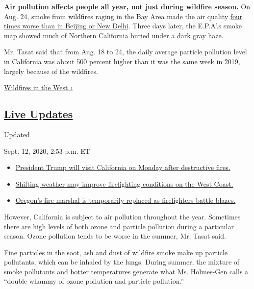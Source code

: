 \textbf{Air pollution affects people all year, not just during wildfire
season.} On Aug. 24, smoke from wildfires raging in the Bay Area made
the air quality
\href{https://www.nytimes3xbfgragh.onion/2020/08/24/us/california-fires-wildfires.html}{four
times worse than in Beijing or New Delhi}. Three days later, the
E.P.A'.s smoke map showed much of Northern California buried under a
dark gray haze.

Mr. Tasat said that from Aug. 18 to 24, the daily average particle
pollution level in California was about 500 percent higher than it was
the same week in 2019, largely because of the wildfires.

\href{https://www.nytimes3xbfgragh.onion/spotlight/california-wildfires}{Wildfires
in the West ›}

\hypertarget{live-updates}{%
\subsection{\texorpdfstring{\href{https://www.nytimes3xbfgragh.onion/2020/09/12/us/wildfires-live-updates.html}{Live
Updates}}{Live Updates}}\label{live-updates}}

Updated~

Sept. 12, 2020, 2:53 p.m. ET

\begin{itemize}
\tightlist
\item
  \href{https://www.nytimes3xbfgragh.onion/2020/09/12/us/wildfires-live-updates.html\#link-f3961ff}{President
  Trump will visit California on Monday after destructive fires.}
\item
  \href{https://www.nytimes3xbfgragh.onion/2020/09/12/us/wildfires-live-updates.html\#link-7e503ae9}{Shifting
  weather may improve firefighting conditions on the West Coast.}
\item
  \href{https://www.nytimes3xbfgragh.onion/2020/09/12/us/wildfires-live-updates.html\#link-5e4c548d}{Oregon's
  fire marshal is temporarily replaced as firefighters battle blazes.}
\end{itemize}

However, California is subject to air pollution throughout the year.
Sometimes there are high levels of both ozone and particle pollution
during a particular season. Ozone pollution tends to be worse in the
summer, Mr. Tasat said.

Fine particles in the soot, ash and dust of wildfire smoke make up
particle pollutants, which can be inhaled by the lungs. During summer,
the mixture of smoke pollutants and hotter temperatures generate what
Ms. Holmes-Gen calls a ``double whammy of ozone pollution and particle
pollution.''

